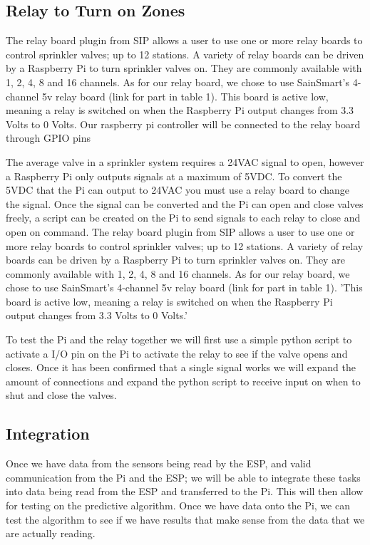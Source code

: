 \documentclass[letterpaper, 10 pt, conference]{ieeeconf}  %
\begin{document}
\subsection{Relay to Turn on Zones}
The relay board plugin from SIP \cite{SIP} allows a user to use one or more relay boards to control sprinkler valves; up to 12 stations. A variety of relay boards can be driven by a Raspberry Pi to turn sprinkler valves on. They are commonly available with 1, 2, 4, 8 and 16 channels. As for our relay board, we chose to use SainSmart's \cite{relayBoard} 4-channel 5v relay board (link for part in table 1). This board is active low, meaning a relay is switched on when the Raspberry Pi output changes from 3.3 Volts to 0 Volts. Our raspberry pi controller will be connected to the relay board through GPIO pins

The average valve in a sprinkler system requires a 24VAC signal to open, however a Raspberry Pi only outputs signals at a maximum of 5VDC. To convert the 5VDC that the Pi can output to 24VAC you must use a relay board to change the signal. Once the signal can be converted and the Pi can open and close valves freely, a script can be created on the Pi to send signals to each relay to close and open on command. The relay board plugin from SIP \cite{SIP} allows a user to use one or more relay boards to control sprinkler valves; up to 12 stations. A variety of relay boards can be driven by a Raspberry Pi to turn sprinkler valves on. They are commonly available with 1, 2, 4, 8 and 16 channels. As for our relay board, we chose to use SainSmart's \cite{relayBoard} 4-channel 5v relay board (link for part in table 1). 'This board is active low, meaning a relay is switched on when the Raspberry Pi output changes from 3.3 Volts to 0 Volts.'

To test the Pi and the relay together we will first use a simple python script to activate a I/O pin on the Pi to activate the relay to see if the valve opens and closes. Once it has been confirmed that a single signal works we will expand the amount of connections and expand the python script to receive input on when to shut and close the valves.


\subsection{Integration}
Once we have data from the sensors being read by the ESP, and valid communication from the Pi and the ESP; we will be able to integrate these tasks into data being read from the ESP and transferred to the Pi. This will then allow for testing on the predictive algorithm. Once we have data onto the Pi, we can test the algorithm to see if we have results that make sense from the data that we are actually reading. 
\end{document}
